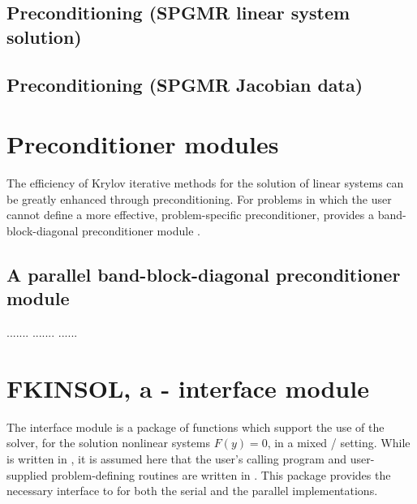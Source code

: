 \subsection{Preconditioning (SPGMR linear system solution)} \label{ss:psolveFn}

\subsection{Preconditioning (SPGMR Jacobian data)}\label{ss:precondFn}

\section{Preconditioner modules}\label{ss:preconds}
The efficiency of Krylov iterative methods for the solution of linear systems 
can be greatly enhanced through preconditioning. For problems in which the 
user cannot define a more effective, problem-specific preconditioner,
{\kinsol} provides a band-block-diagonal preconditioner module {\kinbbdpre}.

\subsection{A parallel band-block-diagonal preconditioner module}
\label{sss:kinbbdpre}
.......
.......
......

\section{FKINSOL, a {\F}-{\C} interface module}\label{ss:fcmix}

The {\fkinsol} interface module is a package of {\C} functions which support
the use of the {\kinsol} solver, for the solution nonlinear systems
$F(y)=0$, in a mixed {\F}/{\C} setting.  While {\kinsol} is written
in {\C}, it is assumed here that the user's calling program and
user-supplied problem-defining routines are written in {\F}.
This package provides the necessary interface to {\kinsol} for both the
serial and the parallel {\nvector} implementations.

